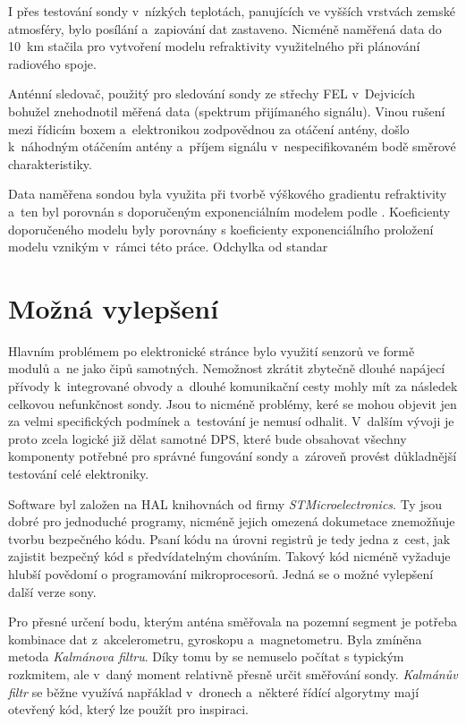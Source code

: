 \documentclass[twoside]{ctuthesis}
\theoremstyle{plain}
\theoremstyle{definition}
\theoremstyle{note}
\begin{document}
	I přes testování sondy v~nízkých teplotách, panujících ve vyšších vrstvách zemské atmosféry, bylo posílání a~zapiování dat zastaveno. Nicméně naměřená data do 10~km stačila pro vytvoření modelu refraktivity využitelného při plánování radiového spoje.

	Anténní sledovač, použitý pro sledování sondy ze střechy FEL v~Dejvicích bohužel znehodnotil měřená data (spektrum přijímaného signálu). Vinou rušení mezi řídicím boxem a~elektronikou zodpovědnou za otáčení antény, došlo k~náhodným otáčením antény a~příjem signálu v~nespecifikovaném bodě směrové charakteristiky. 

	Data naměřena sondou byla využita při tvorbě výškového gradientu refraktivity a~ten byl porovnán s doporučeným exponenciálním modelem podle \cite{ITU:refrac}. Koeficienty doporučeného modelu byly porovnány s koeficienty exponenciálního proložení modelu vznikým v~rámci této práce. Odchylka od standar



	\section{Možná vylepšení}
	Hlavním problémem po elektronické stránce bylo využití senzorů ve formě modulů a~ne jako čipů samotných. Nemožnost zkrátit zbytečně dlouhé napájecí přívody k~integrované obvody a~dlouhé komunikační cesty mohly mít za následek celkovou nefunkčnost sondy. Jsou to nicméně problémy, keré se mohou objevit jen za velmi specifických podmínek a~testování je nemusí odhalit. V~dalším vývoji je proto zcela logické již dělat samotné DPS, které bude obsahovat všechny komponenty potřebné pro správné fungování sondy a~zároveň provést důkladnější testování celé elektroniky.

	Software byl založen na HAL knihovnách od firmy \textit{STMicroelectronics}. Ty jsou dobré pro jednoduché programy, nicméně jejich omezená dokumetace znemožňuje tvorbu bezpečného kódu. Psaní kódu na úrovni registrů je tedy jedna z~cest, jak zajistit bezpečný kód s předvídatelným chováním. Takový kód nicméně vyžaduje hlubší povědomí o programování mikroprocesorů. Jedná se o možné vylepšení další verze sony.

	Pro přesné určení bodu, kterým anténa směřovala na pozemní segment je potřeba kombinace dat z~akcelerometru, gyroskopu a~magnetometru. Byla zmíněna metoda \textit{Kalmánova filtru}. Díky tomu by se nemuselo počítat s typickým rozkmitem, ale v~daný moment relativně přesně určit směřování sondy. \textit{Kalmánův filtr} se běžne využívá napřáklad v~dronech a~některé řídící algorytmy mají otevřený kód, který lze použít pro inspiraci.
\end{document}
